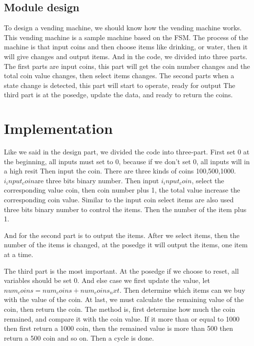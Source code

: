 \documentclass[12pt,a4paper]{article}
\begin{document}
\subsection{Module design}

To design a vending machine, we should know how the vending machine works.
This vending machine is a sample machine based on the FSM.
The process of the machine is that input coins and then choose items like drinking, or water, then it will give changes and output items.
And in the code, we divided into three parts. 
The first parts are input coins, this part will get the coin number changes and the total coin value changes, then select items changes.
The second parts when a state change is detected, this part will start to operate, ready for output
The third part is at the posedge, update the data, and ready to return the coins. 




\newpage

\section{Implementation}

Like we said in the design part, we divided the code into three-part.
First set 0 at the beginning, all inputs must set to 0, because if we don't set 0, all inputs will in a high resit
Then input the coin. There are three kinds of coins 100,500,1000.
$i_input_coin $are three bits binary number. 
Then input $i_input_coin$, select the corresponding value coin, then coin number plus 1, the total value increase the corresponding coin value.
Similar to the input coin select items are also used three bits binary number to control the items.
Then the number of the item plus 1.

And for the second part is to output the items. 
After we select items, then the number of the items is changed, at the posedge it will output the items, one item at a time.

The third part is the most important.
At the posedge if we choose to reset, all variables should be set 0.
And else case we first update the value, let $num_coins =num_coins + num_coins_nxt.$
Then determine which items can we buy with the value of the coin.
At last, we must calculate the remaining value of the coin, then return the coin.
The method is, first determine how much the coin remained, and compare it with the coin value.
If it more than or equal to 1000 then first return a 1000 coin, then the remained value is more than 500 then return a 500 coin and so on.
Then a cycle is done.  
\end{document}

